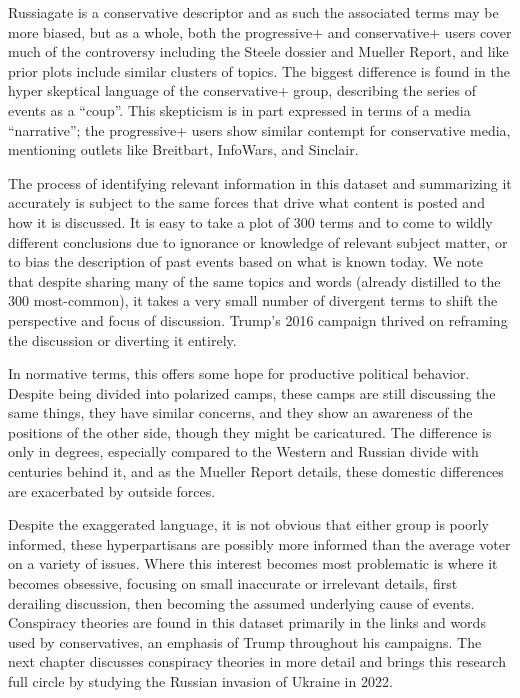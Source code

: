 \documentclass[doublespacing]{utdthesis}
\begin{document}
Russiagate is a conservative descriptor and as such the associated terms may be more biased, but as a whole, both the progressive+ and conservative+ users cover much of the controversy including the Steele dossier and Mueller Report, and like prior plots include similar clusters of topics.
The biggest difference is found in the hyper skeptical language of the conservative+ group, describing the series of events as a ``coup''.
This skepticism is in part expressed in terms of a media ``narrative''; the progressive+ users show similar contempt for conservative media, mentioning outlets like Breitbart, InfoWars, and Sinclair.

The process of identifying relevant information in this dataset and summarizing it accurately is subject to the same forces that drive what content is posted and how it is discussed.
It is easy to take a plot of 300 terms and to come to wildly different conclusions due to ignorance or knowledge of relevant subject matter, or to bias the description of past events based on what is known today.
We note that despite sharing many of the same topics and words (already distilled to the 300 most-common), it takes a very small number of divergent terms to shift the perspective and focus of discussion.
Trump's 2016 campaign thrived on reframing the discussion or diverting it entirely.

In normative terms, this offers some hope for productive political behavior.
Despite being divided into polarized camps, these camps are still discussing the same things, they have similar concerns, and they show an awareness of the positions of the other side, though they might be caricatured.
The difference is only in degrees, especially compared to the Western and Russian divide with centuries behind it, and as the Mueller Report details, these domestic differences are exacerbated by outside forces.

Despite the exaggerated language, it is not obvious that either group is poorly informed, these hyperpartisans are possibly more informed than the average voter on a variety of issues.
Where this interest becomes most problematic is where it becomes obsessive, focusing on small inaccurate or irrelevant details, first derailing discussion, then becoming the assumed underlying cause of events.
Conspiracy theories are found in this dataset primarily in the links and words used by conservatives, an emphasis of Trump throughout his campaigns.
The next chapter discusses conspiracy theories in more detail and brings this research full circle by studying the Russian invasion of Ukraine in 2022.
\end{document}
